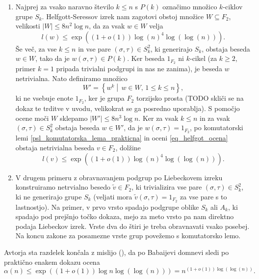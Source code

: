 \documentclass[mat1, tisk]{fmfdelo}
\numberwithin{equation}{section}  %
\begin{document}
\begin{enumerate}
    \item Najprej za vsako naravno število $k \le n$ s $P(k)$ označimo množico $k$-ciklov grupe $S_k$. Helfgott-Seressov izrek nam zagotovi obstoj množice $W \subseteq F_2$, velikosti $\lvert W \rvert \le 8n^2 \log n$, da za vsak $w \in W$ velja \begin{equation}\label{eq_helfgot_ocena}
        l(w) \le \exp((1 + o(1)) \log(n)^{4} \log(\log(n))).
    \end{equation}  
    Še več, za vse $k \le n$ in vse pare $(\sigma, \tau) \in S_k^2$, ki generirajo $S_k$,
    obstaja beseda $w \in W$, tako da je $w(\sigma, \tau) \in P(k)$. Ker beseda $1_{F_2}$ ni $k$-cikel (za $k \ge 2$, primer $k = 1$ pripada trivialni podgrupi in nas ne zanima), je beseda $w$ netrivialna. Nato definiramo množico \begin{equation*}
    W' = \left\{ w^{k}  \middle|\,  w \in W , \, 1 \le  k \le  n \right\}, 
    \end{equation*}  
    ki ne vsebuje enote $1_{F_2}$, ker je grupa $F_2$ torzijsko prosta (TODO skliči se na dokaz te trditve v uvodu, velikokrat se ga posredno uporablja). S pomočjo ocene moči $W$ sklepamo $\lvert W' \rvert \le 8 n^3 \log n$.
    Ker za vsak $k \le n$ in za vsak $(\sigma, \tau) \in S_k^2$ obstaja beseda $w \in W'$, da je $w(\sigma, \tau) = 1_{F_2}$, po komutatorski lemi \ref{psl_komutatorska_lema_prakticna} in oceni \ref{eq_helfgot_ocena} obstaja netrivialna beseda $v \in F_2$, dolžine
    \begin{equation*}
    l(v) \le \exp((1 + o(1)) \log(n)^{4} \log(\log(n))).
    \end{equation*}  
    \item V drugem primeru z obravnavanjem podgrup po Liebeckovem izreku konstruiramo netrvialno besedo $\tilde{v} \in F_2$, ki trivializira vse pare $(\sigma, \tau) \in S_k^2$, ki ne generirajo
    grupe $S_k$ (veljati mora $\tilde{v}(\sigma, \tau) = 1_{F_2}$ za vse pare s to lastnostjo). Na primer, v prvo vrsto spadajo podgrupe oblike $S_k$ ali $A_k$, ki spadajo pod prejšnjo točko dokaza, mejo za meto vrsto pa nam direktno podaja Liebeckov izrek. Vrste dva do štiri je treba obravnavati
    vsako posebej. Na koncu zakone za posamezne vrste grup povežemo s komutatorsko lemo.    
\end{enumerate}

Avtorja sta razdelek končala z mislijo (\cite[str.~82]{Kozma_Gady_2016}), da po Babaijevi domnevi sledi po praktično enakem dokazu ocena \begin{equation*}
\alpha(n) \le \exp((1 + o(1)) \log{n} \log(\log (n))) = n^{(1 + o(1)) \log(\log(n))}.
\end{equation*}  
\end{document}
